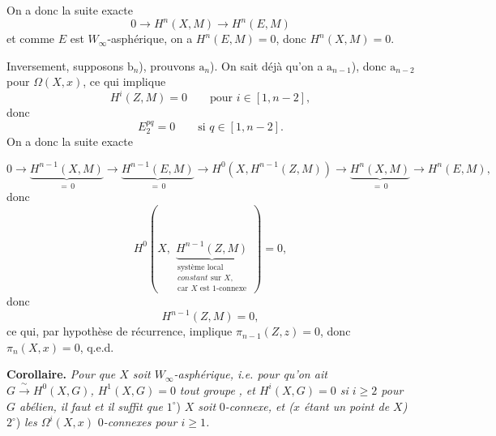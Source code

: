 
On a donc la suite exacte
\[
0 \longrightarrow H^n(X,M) \longrightarrow H^n(E,M)
\]
et comme $E$ est $W_\infty$-asphérique, on a $H^n(E,M) = 0$, donc $H^n(X,M) = 0$.

Inversement, supposons $\mathrm{b}_n$), prouvons $\mathrm{a}_n$). On sait déjà qu'on a $\mathrm{a}_{n-1}$), donc $\mathrm{a}_{n-2}$ pour $\Omega(X,x)$, ce qui implique
\[
H^i(Z,M) = 0 \qquad \text{pour } i \in [1,n-2],
\]
donc
\[
E_2^{pq} = 0 \qquad \text{si } q \in [1,n-2].
\]
On a donc la suite exacte

\[
0 \longrightarrow \underbrace{H^{n-1}(X,M)}_{=\,0} \longrightarrow \underbrace{H^{n-1}(E,M)}_{=\,0} \longrightarrow H^0(X,H^{n-1}(Z,M)) \longrightarrow \underbrace{H^n(X,M)}_{=\,0} \longrightarrow H^n(E,M),
\]
donc
\[
H^0(X,\ \underbrace{H^{n-1}(Z,M)}_{\begin{array}{l}\text{système local}\\ \textit{constant}\text{ sur } X,\\ \text{car } X \text{ est 1-connexe}\end{array}}\ ) = 0,
\]
donc
\[
H^{n-1}(Z,M) = 0,
\]
ce qui, par hypothèse de récurrence, implique $\pi_{n-1}(Z,z) = 0$, donc $\pi_n(X,x) = 0$, q.e.d.

\textbf{Corollaire.} \textit{Pour que $X$ soit $W_\infty$-asphérique, i.e. pour qu'on ait $G \xrightarrow{\ \sim\ } H^0(X,G)$, $H^1(X,G) = 0$} \textit{tout groupe} \textit{, et $H^i(X,G) = 0$ si $i \geq 2$ pour $G$ abélien, il faut et il suffit que} $1^\circ$) \textit{$X$ soit} $0$\textit{-connexe, et ($x$ étant un point de $X$)} $2^\circ$) \textit{les $\Omega^i(X,x)$} $0$\textit{-connexes pour $i \geq 1$.}


